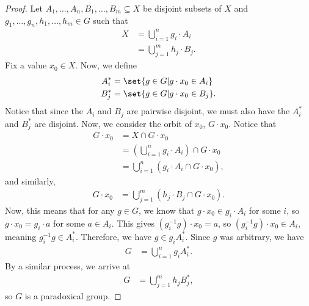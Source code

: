 \documentclass[10pt]{mypackage2}
\begin{document}
\begin{proof}
  Let $A_1,\dots,A_n,B_1,\dots,B_m\subseteq X$ be disjoint subsets of $X$ and $g_1,\dots,g_n,h_1,\dots,h_m\in G$ such that
  \begin{align*}
    X &= \bigcup_{i=1}^{n}g_i\cdot A_i\\
      &= \bigcup_{j=1}^{m}h_j\cdot B_j.
  \end{align*}
  Fix a value $x_0\in X$. Now, we define
  \begin{align*}
    A_i^{\ast} &= \set{g\in G | g\cdot x_0\in A_i}\\
    B_j^{\ast} &= \set{g\in G | g\cdot x_0\in B_j}.
  \end{align*}
  Notice that since the $A_i$ and $B_j$ are pairwise disjoint, we must also have the $A_i^{\ast}$ and $B_j^{\ast}$ are disjoint. Now, we consider the orbit of $x_0$, $G\cdot x_0$. Notice that
  \begin{align*}
    G\cdot x_0 &= X\cap G\cdot x_0\\
               &= \left( \bigcup_{i=1}^{n}g_i\cdot A_i \right)\cap G\cdot x_0\\
               &= \bigcup_{i=1}^{n}\left( g_i\cdot A_i\cap G\cdot x_0 \right),
  \end{align*}
  and similarly,
  \begin{align*}
    G\cdot x_0 &= \bigcup_{j=1}^{m}\left( h_j\cdot B_j \cap G\cdot x_0 \right).
  \end{align*}
  Now, this means that for any $g\in G$, we know that $g\cdot x_0\in g_i\cdot A_i$ for some $i$, so $g\cdot x_0 = g_i\cdot a$ for some $a\in A_i$. This gives $\left( g_i^{-1}g \right)\cdot x_0 = a$, so $\left( g_i^{-1}g \right)\cdot x_0 \in A_i$, meaning $g_i^{-1}g\in A_i^{\ast}$. Therefore, we have $g\in g_iA_i^{\ast}$. Since $g$ was arbitrary, we have
  \begin{align*}
    G &= \bigcup_{i=1}^{n}g_iA_i^{\ast}.
  \end{align*}
  By a similar process, we arrive at
  \begin{align*}
    G &= \bigcup_{j=1}^{m}h_jB_j^{\ast},
  \end{align*}
  so $G$ is a paradoxical group.
\end{proof}
\end{document}
